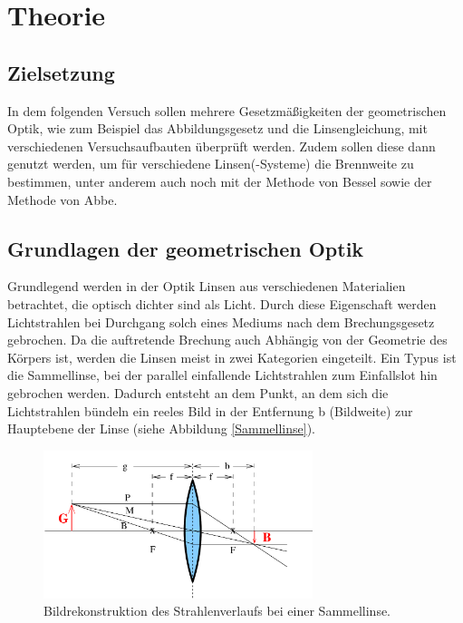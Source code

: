 



\section{Theorie}

\subsection{Zielsetzung}

In dem folgenden Versuch sollen mehrere Gesetzmäßigkeiten der geometrischen Optik,
wie zum Beispiel das Abbildungsgesetz und die Linsengleichung, mit verschiedenen
Versuchsaufbauten überprüft werden. Zudem sollen diese dann genutzt werden, um
für verschiedene Linsen(-Systeme) die Brennweite zu bestimmen, unter anderem auch
noch mit der Methode von Bessel sowie der Methode von Abbe.

\subsection{Grundlagen der geometrischen Optik}

Grundlegend werden in der Optik Linsen aus verschiedenen Materialien betrachtet,
die optisch dichter sind als Licht. Durch diese Eigenschaft werden Lichtstrahlen
bei Durchgang solch eines Mediums nach dem Brechungsgesetz gebrochen. Da die
auftretende Brechung auch Abhängig von der Geometrie des Körpers ist, werden
die Linsen meist in zwei Kategorien eingeteilt. Ein Typus ist die Sammellinse, bei
der parallel einfallende Lichtstrahlen zum Einfallslot hin gebrochen werden.
Dadurch entsteht an dem Punkt, an dem sich die Lichtstrahlen bündeln ein reeles
Bild in der Entfernung b (Bildweite) zur Hauptebene der Linse (siehe Abbildung
\ref{Sammellinse}).

\begin{figure}
  \centering
  \includegraphics[width = 0.7\textwidth]{Sammellinse.png}
  \caption{Bildrekonstruktion des Strahlenverlaufs bei einer Sammellinse.\cite{anleitung01}}
  \label{fig:Sammellinse}
\end{figure}

